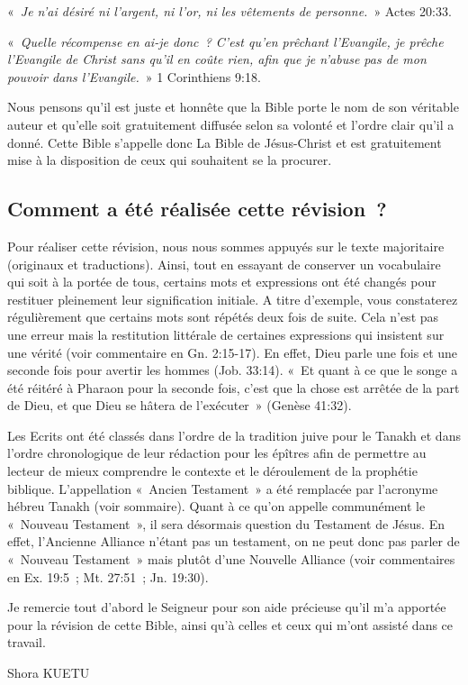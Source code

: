\begin{small}
«~\emph{Je n'ai désiré ni l'argent, ni l'or, ni les vêtements de personne.}~» Actes 20:33.\bigskip

«~\emph{Quelle récompense en ai-je donc~? C’est qu’en prêchant l’Evangile, je prêche l’Evangile de Christ sans qu’il en coûte rien, afin que je n’abuse pas de mon pouvoir dans l’Evangile.}~» 1 Corinthiens 9:18.\bigskip

Nous pensons qu'il est juste et honnête que la Bible porte le nom de son véritable auteur et qu'elle soit gratuitement diffusée selon sa volonté et l'ordre clair qu'il a donné. Cette Bible s'appelle donc La Bible de Jésus-Christ et est gratuitement mise à la disposition de ceux qui souhaitent se la procurer.\bigskip

\subsection*{Comment a été réalisée cette révision~?}

Pour réaliser cette révision, nous nous sommes appuyés sur le texte majoritaire (originaux et traductions). Ainsi, tout en essayant de conserver un vocabulaire qui soit à la portée de tous, certains mots et expressions ont été changés pour restituer pleinement leur signification initiale. A titre d'exemple, vous constaterez régulièrement que certains mots sont répétés deux fois de suite. Cela n'est pas une erreur mais la restitution littérale de certaines expressions qui insistent sur une vérité (voir commentaire en Gn. 2:15-17). En effet, Dieu parle une fois et une seconde fois pour avertir les hommes (Job. 33:14). «~Et quant à ce que le songe a été réitéré à Pharaon pour la seconde fois, c'est que la chose est arrêtée de la part de Dieu, et que Dieu se hâtera de l'exécuter~» (Genèse 41:32).\bigskip

Les Ecrits ont été classés dans l'ordre de la tradition juive pour le Tanakh et dans l'ordre chronologique de leur rédaction pour les épîtres afin de permettre au lecteur de mieux comprendre le contexte et le déroulement de la prophétie biblique. L'appellation «~Ancien Testament~» a été remplacée par l'acronyme hébreu Tanakh (voir sommaire). Quant à ce qu'on appelle communément le «~Nouveau Testament~», il sera désormais question du Testament de Jésus. En effet, l'Ancienne Alliance n'étant pas un testament, on ne peut donc pas parler de «~Nouveau Testament~» mais plutôt d'une Nouvelle Alliance (voir commentaires en Ex. 19:5~; Mt. 27:51~; Jn. 19:30).\bigskip

Je remercie tout d'abord le Seigneur pour son aide précieuse qu'il m'a apportée pour la révision de cette Bible, ainsi qu'à celles et ceux qui m’ont assisté dans ce travail.\newline

\begin{flushright}
Shora KUETU
\end{flushright}
\end{small}
